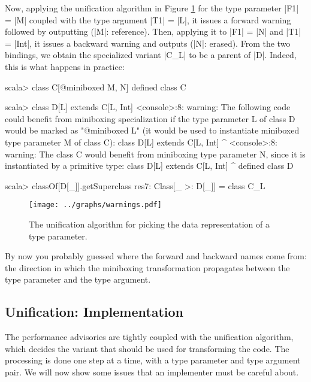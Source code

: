 Now, applying the unification algorithm in Figure \ref{fig:algorithm} for the type parameter |F1| = |M| coupled with the type argument |T1| = |L|, it issues a forward warning followed by outputting (|M|: reference). Then, applying it to |F1| = |N| and |T1| = |Int|, it issues a backward warning and outputs (|N|: erased). From the two bindings, we obtain the specialized variant |C_L| to be a parent of |D|. Indeed, this is what happens in practice:

\begin{lstlisting-nobreak-nolang}
scala> class C[@miniboxed M, N]
defined class C

scala> class D[L] extends C[L, Int]
<console>:8: warning: The following code could benefit from miniboxing specialization if the type parameter L of class D would be marked as "@miniboxed L" (it would be used to instantiate miniboxed type parameter M of class C):
       class D[L] extends C[L, Int]
             ^
<console>:8: warning: The class C would benefit from miniboxing type parameter N, since it is instantiated by a primitive type:
       class D[L] extends C[L, Int]
             ^
defined class D

scala> classOf[D[_]].getSuperclass
res7: Class[_ >: D[_]] = class C_L
\end{lstlisting-nobreak-nolang}

\begin{figure}[t!]
  \vspace{0.01\textheight}
  \centering
  \texttt{[image: ../graphs/warnings.pdf]}
  \caption{The unification algorithm for picking the data representation of a type parameter.}
  \label{fig:algorithm}
\end{figure}

By now you probably guessed where the forward and backward names come from: the direction in which the miniboxing transformation propagates between the type parameter and the type argument.

\subsection{Unification: Implementation}

The performance advisories are tightly coupled with the unification algorithm, which decides the variant that should be used for transforming the code. The processing is done one step at a time, with a type parameter and type argument pair. We will now show some issues that an implementer must be careful about.

